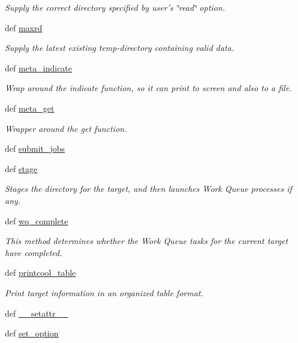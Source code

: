 \begin{DoxyCompactItemize}
\begin{DoxyCompactList}\small\item\em Supply the correct directory specified by user's \char`\"{}read\char`\"{} option. \end{DoxyCompactList}\item 
def \hyperlink{classforcebalance_1_1target_1_1Target_a961ce7e772836b1465cb44e3f03145df}{maxrd}
\begin{DoxyCompactList}\small\item\em Supply the latest existing temp-\/directory containing valid data. \end{DoxyCompactList}\item 
def \hyperlink{classforcebalance_1_1target_1_1Target_a99c84ef8ea504d7699c927e261f648e4}{meta\-\_\-indicate}
\begin{DoxyCompactList}\small\item\em Wrap around the indicate function, so it can print to screen and also to a file. \end{DoxyCompactList}\item 
def \hyperlink{classforcebalance_1_1target_1_1Target_a17c8ac0c7dd0a0430accddfd12602103}{meta\-\_\-get}
\begin{DoxyCompactList}\small\item\em Wrapper around the get function. \end{DoxyCompactList}\item 
def \hyperlink{classforcebalance_1_1target_1_1Target_a78cd29b94cbcc201eed99c78aaef46a4}{submit\-\_\-jobs}
\item 
def \hyperlink{classforcebalance_1_1target_1_1Target_af8d2a4658c87841e40296795aec478bb}{stage}
\begin{DoxyCompactList}\small\item\em Stages the directory for the target, and then launches Work Queue processes if any. \end{DoxyCompactList}\item 
def \hyperlink{classforcebalance_1_1target_1_1Target_af6099ec09486213869dba2491bd8ea04}{wq\-\_\-complete}
\begin{DoxyCompactList}\small\item\em This method determines whether the Work Queue tasks for the current target have completed. \end{DoxyCompactList}\item 
def \hyperlink{classforcebalance_1_1target_1_1Target_ac30a4e9d7d9fe06f7caefa5f7cfab09b}{printcool\-\_\-table}
\begin{DoxyCompactList}\small\item\em Print target information in an organized table format. \end{DoxyCompactList}\item 
def \hyperlink{classforcebalance_1_1BaseClass_a0c851d413c3b2f30561b72a46771bcff}{\-\_\-\-\_\-setattr\-\_\-\-\_\-}
\item 
def \hyperlink{classforcebalance_1_1BaseClass_a73e9a37a7632e79eb99f49bd15aced45}{set\-\_\-option}
\end{DoxyCompactItemize}
